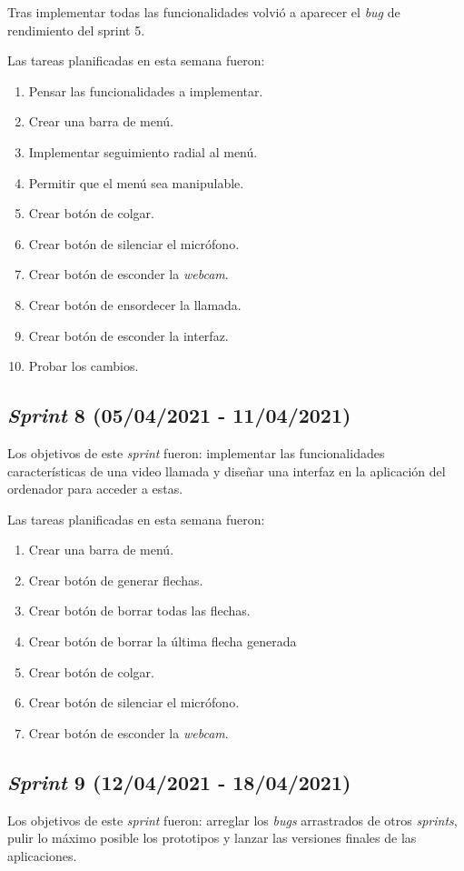 Tras implementar todas las funcionalidades volvió a aparecer el \textit{bug} de rendimiento del sprint 5.

Las tareas planificadas en esta semana fueron:
\begin{enumerate}
    \item Pensar las funcionalidades a implementar.
    \item Crear una barra de menú.
    \item Implementar seguimiento radial al menú.
    \item Permitir que el menú sea manipulable.
    \item Crear botón de colgar.
    \item Crear botón de silenciar el micrófono.
    \item Crear botón de esconder la \textit{webcam}.
    \item Crear botón de ensordecer la llamada.
    \item Crear botón de esconder la interfaz.
    \item Probar los cambios.
    
\end{enumerate}
\subsection{\textit{Sprint} 8 (05/04/2021 - 11/04/2021)}
Los objetivos de este \textit{sprint} fueron: implementar las funcionalidades características de una video llamada y diseñar una interfaz en la aplicación del ordenador para acceder a estas.

Las tareas planificadas en esta semana fueron:
\begin{enumerate}
    \item Crear una barra de menú.
    \item Crear botón de generar flechas.
    \item Crear botón de borrar todas las flechas.
    \item Crear botón de borrar la última flecha generada
    \item Crear botón de colgar.
    \item Crear botón de silenciar el micrófono.
    \item Crear botón de esconder la \textit{webcam}.
\end{enumerate}
\subsection{\textit{Sprint} 9 (12/04/2021 - 18/04/2021)}
Los objetivos de este \textit{sprint} fueron: arreglar los \textit{bugs} arrastrados de otros \textit{sprints}, pulir lo máximo posible los prototipos y lanzar las versiones finales de las aplicaciones.


